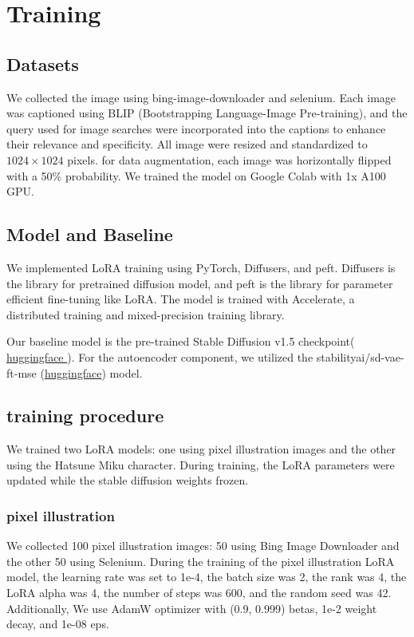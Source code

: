 \documentclass[extendedabs]{bmvc2k}
\begin{document}
\section{Training}
\subsection{Datasets}
We collected the image using bing-image-downloader and selenium. Each image was captioned using BLIP (Bootstrapping Language-Image Pre-training)\cite{blip}, and the query used for image searches were incorporated into the captions to enhance their relevance and specificity. All image were resized and standardized to $1024\times1024$ pixels. for data augmentation, each image was horizontally flipped with a 50\% probability.
We trained the model on Google Colab with 1x A100 GPU.
\subsection{Model and Baseline}
We implemented LoRA training using PyTorch, Diffusers, and peft. Diffusers is the library for pretrained diffusion model, and peft is the library for parameter efficient fine-tuning like LoRA\cite{lora}. The model is trained with Accelerate, a distributed training and mixed-precision training library.

Our baseline model is the pre-trained Stable Diffusion v1.5 checkpoint( \href { https://huggingface.co/stable-diffusion-v1-5/stable-diffusion-v1-5 } { huggingface }). For the autoencoder component, we utilized the stabilityai/sd-vae-ft-mse (\href{https://huggingface.co/stabilityai/sd-vae-ft-mse}{huggingface}) model.
\subsection{training procedure}
We trained two LoRA models: one using pixel illustration images and the other using the Hatsune Miku character. During training, the LoRA parameters were updated while the stable diffusion weights frozen.
\subsubsection{pixel illustration}
We collected 100 pixel illustration images: 50 using Bing Image Downloader and the other 50 using Selenium.
During the training of the pixel illustration LoRA model, the learning rate was set to 1e-4, the batch size was 2, the rank was 4, the LoRA alpha was 4, the number of steps was 600, and the random seed was 42. Additionally, We use AdamW\cite{adamw} optimizer with (0.9, 0.999) betas, 1e-2 weight decay, and 1e-08 eps.
\end{document}
